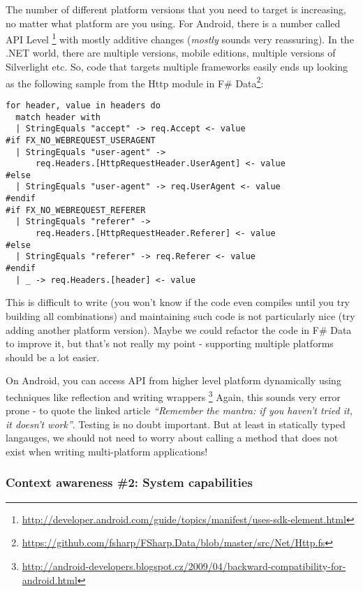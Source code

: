 The number of different platform versions that you need to target is increasing, no matter what 
platform are you using. For Android, there is a number called API Level 
\footnote{\url{http://developer.android.com/guide/topics/manifest/uses-sdk-element.html}}
with mostly additive changes (\emph{mostly} sounds very reassuring). In the .NET world, there are multiple
versions, mobile editions, multiple versions of Silverlight etc. So, code that targets multiple
frameworks easily ends up looking as the following sample from the Http module in F\# Data\footnote{
\url{https://github.com/fsharp/FSharp.Data/blob/master/src/Net/Http.fs}}:

\begin{verbatim}
for header, value in headers do
  match header with
  | StringEquals "accept" -> req.Accept <- value
#if FX_NO_WEBREQUEST_USERAGENT
  | StringEquals "user-agent" -> 
      req.Headers.[HttpRequestHeader.UserAgent] <- value
#else
  | StringEquals "user-agent" -> req.UserAgent <- value
#endif
#if FX_NO_WEBREQUEST_REFERER
  | StringEquals "referer" -> 
      req.Headers.[HttpRequestHeader.Referer] <- value
#else
  | StringEquals "referer" -> req.Referer <- value
#endif
  | _ -> req.Headers.[header] <- value
\end{verbatim}

This is difficult to write (you won't know if the code even compiles until you try building all 
combinations) and maintaining such code is not particularly nice (try adding another platform version).
Maybe we could refactor the code in F\# Data to improve it, but that's not really my point - supporting
multiple platforms should be a lot easier.

On Android, you can access API from higher level platform dynamically using techniques like 
reflection and writing wrappers 
\footnote{\url{http://android-developers.blogspot.cz/2009/04/backward-compatibility-for-android.html}}
Again, this sounds very error prone - to quote the linked article 
\emph{``Remember the mantra: if you haven't tried it, it doesn't work''}.
Testing is no doubt important. But at least in statically typed langauges, we
should not need to worry about calling a method that does not exist when writing
multi-platform applications!


\subsubsection{Context awareness \#2: System capabilities}

